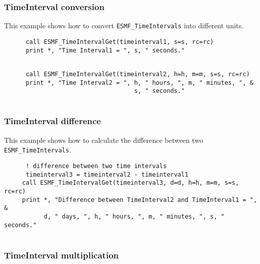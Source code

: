   \subsubsection{TimeInterval conversion}
 
   This example shows how to convert {\tt ESMF\_TimeIntervals} into 
   different units. 

 \begin{verbatim}
      call ESMF_TimeIntervalGet(timeinterval1, s=s, rc=rc)
      print *, "Time Interval1 = ", s, " seconds."
 
\end{verbatim}
 

 \begin{verbatim}
      call ESMF_TimeIntervalGet(timeinterval2, h=h, m=m, s=s, rc=rc)
      print *, "Time Interval2 = ", h, " hours, ", m, " minutes, ", &
                                    s, " seconds."
 
\end{verbatim}
 

  \subsubsection{TimeInterval difference}
 
   This example shows how to calculate the difference between two 
   {\tt ESMF\_TimeIntervals}.  

 \begin{verbatim}
      ! difference between two time intervals
      timeinterval3 = timeinterval2 - timeinterval1
     call ESMF_TimeIntervalGet(timeinterval3, d=d, h=h, m=m, s=s, rc=rc)
     print *, "Difference between TimeInterval2 and TimeInterval1 = ", &
           d, " days, ", h, " hours, ", m, " minutes, ", s, " seconds."
 
\end{verbatim}
 

  \subsubsection{TimeInterval multiplication}
 
